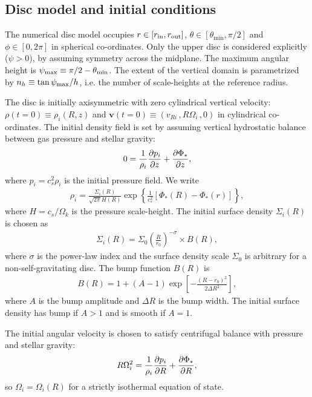 \subsection{Disc model and initial conditions}\label{IC}
The numerical disc model occupies $r\in[r_\mathrm{in},r_\mathrm{out}]$, $\theta\in[\theta_\mathrm{min},
  \pi/2]$ and $\phi\in[0,2\pi]$ in spherical co-ordinates. 
Only the upper disc is considered explicitly 
($\psi>0$), by assuming symmetry across the midplane. The maximum
angular height is $\psi_\mathrm{max} \equiv \pi/2 - \theta_\mathrm{min}$. 
The extent of the vertical domain is parametrized by $n_h\equiv
\tan{\psi_\mathrm{max}}/h$, i.e. the number of scale-heights at the reference 
radius.   

The disc is initially axisymmetric with zero cylindrical vertical
velocity: $\rho(t=0)\equiv\rho_i(R,z)$ and
$\bm{v}(t=0)\equiv(v_{Ri}\,, R\Omega_i\,, 0)$ in cylindrical
co-ordinates. The initial density field is set by assuming vertical
hydrostatic balance between gas pressure and stellar gravity:
\begin{align}\label{vert_balance}
  0 = \frac{1}{\rho_i}\frac{\partial p_i}{\partial z} + \frac{\partial \Phi_*}{\partial z},
\end{align}
where $p_i=c_s^2\rho_i$ is the initial pressure field. We write 
\begin{align}\label{init_den}
  \rho_i = \frac{\Sigma_i(R)}{\sqrt{2\pi}H(R)}
  \exp{\left\{\frac{1}{c_s^2}\left[\Phi_*(R) - \Phi_*(r)\right]\right\}},
\end{align}
where $H = c_s/\Omega_k$ is the pressure scale-height. The initial
surface density $\Sigma_i(R)$ is chosen as  
\begin{align}
  \Sigma_i(R) = \Sigma_0\left(\frac{R}{r_0}\right)^{-\sigma}\times B(R),
\end{align}
where $\sigma$ is the power-law index and the surface density scale $\Sigma_0$ 
is arbitrary for a non-self-gravitating disc. 
The bump function $B(R)$ is
\begin{align}
B(R) = 1 + \left(A - 1\right)\exp{\left[-\frac{(R-r_0)^2}{2\Delta R^2}\right]},
\end{align}
where $A$ is the bump amplitude and $\Delta R$ is the bump width. The initial surface 
density has bump if $A>1$ and is smooth if $A=1$. 

The initial angular velocity is chosen
to 
satisfy centrifugal balance with pressure and stellar gravity: 
\begin{align}\label{init_vphi}
  R\Omega^2_i = \frac{1}{\rho_i}\frac{\partial p_i}{\partial
    R} + \frac{\partial\Phi_*}{\partial R},  
\end{align}
so $\Omega_i=\Omega_i(R)$ for a strictly isothermal equation of
state. %

